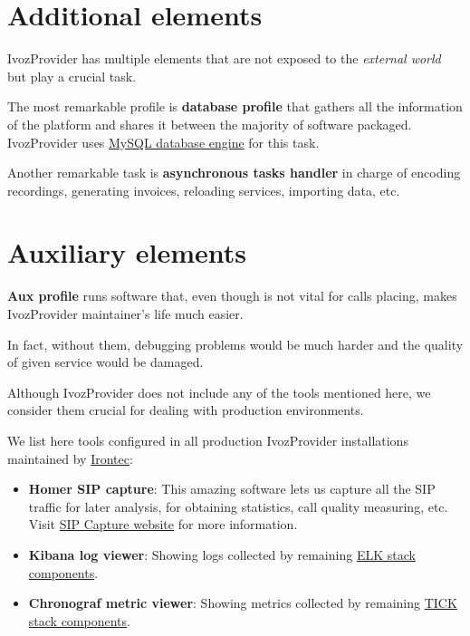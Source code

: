 \documentclass[letterpaper,10pt,english]{sphinxmanual}
\begin{document}
\section{Additional elements}
\label{basic_concepts/architecture/index:additional-elements}
IvozProvider has multiple elements that are not exposed to the \emph{external world}
but play a crucial task.

The most remarkable profile is \textbf{database profile} that gathers all the
information of the platform and shares it between the majority of software packaged.
IvozProvider uses \href{https://www.mysql.com/}{MySQL database engine} for this task.

Another remarkable task is \textbf{asynchronous tasks handler} in charge of encoding recordings,
generating invoices, reloading services, importing data, etc.


\section{Auxiliary elements}
\label{basic_concepts/architecture/index:auxiliary-elements}
\textbf{Aux profile} runs software that, even though is not vital for calls placing,
makes IvozProvider maintainer's life much easier.

In fact, without them, debugging problems would be much harder and the quality
of given service would be damaged.

Although IvozProvider does not include any of the tools mentioned here, we consider them crucial for dealing with
production environments.

We list here tools configured in all production IvozProvider installations maintained by
\href{https://www.irontec.com}{Irontec}:
\begin{itemize}
\item {} 
\textbf{Homer SIP capture}: This amazing software lets us capture all the SIP traffic
for later analysis, for obtaining statistics, call quality measuring, etc.
Visit \href{http://sipcapture.org/}{SIP Capture website} for more information.

\item {} 
\textbf{Kibana log viewer}: Showing logs collected by remaining \href{https://www.elastic.co/elk-stack}{ELK stack components}.

\item {} 
\textbf{Chronograf metric viewer}: Showing metrics collected by remaining \href{https://www.influxdata.com/time-series-platform/}{TICK stack components}.

\end{itemize}
\end{document}
